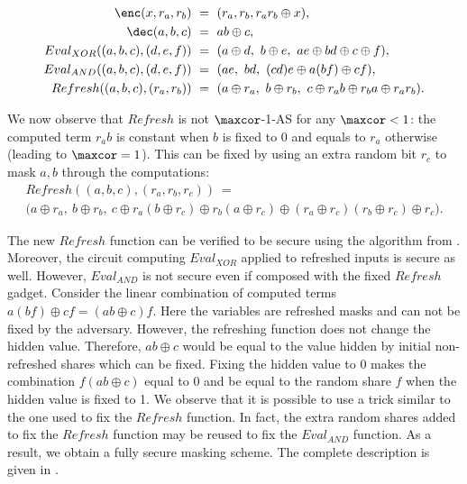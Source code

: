 \begin{figure}
\vspace{-0.5em}
\vspace{-0.5em}
\begin{align}
    \enc(x,r_a,r_b)              &~=~ (r_a,r_b,r_ar_b \oplus x),\\
    \dec(a,b,c)                  &~=~ ab \oplus c,\\
    Eval_{XOR}((a,b,c),(d,e,f)) &~=~ (a\oplus d,~ b \oplus e,~  ae \oplus bd \oplus c \oplus f),\\
    Eval_{AND}((a,b,c),(d,e,f)) &~=~ (ae,~        bd,~         (cd)e \oplus a(bf) \oplus cf),\\
    Refresh((a,b,c),(r_a,r_b))  &~=~ (a \oplus r_a,~ b \oplus r_b,~ c \oplus r_ab \oplus r_ba \oplus r_a r_b).
\end{align}
\vspace{-0.5em}
\end{figure}

We now observe that $Refresh$ is not $\maxcor$-1-AS for any $\maxcor < 1$: the computed term $r_a b$ is constant when $b$ is fixed to 0 and equals to $r_a$ otherwise (leading to $\maxcor = 1$). This can be fixed by using an extra random bit $r_c$ to mask $a,b$ through the computations:
\begin{multline}
    Refresh((a,b,c),(r_a,r_b,r_c)) ~=~ \\
    \big(
    a \oplus r_a,~
    b \oplus r_b,~
    c \oplus r_a(b \oplus r_c) \oplus r_b (a \oplus r_c) \oplus (r_a \oplus r_c)(r_b \oplus r_c) \oplus r_c
    \big).
\end{multline}

The new $Refresh$ function can be verified to be secure using the algorithm from . Moreover, the circuit computing $Eval_{XOR}$ applied to refreshed inputs is secure as well. However, $Eval_{AND}$ is not secure even if composed with the fixed $Refresh$ gadget. Consider the linear combination of computed terms $a(bf) \oplus cf = (ab \oplus c)f$. Here the variables are refreshed masks and can not be fixed by the adversary. However, the refreshing function does not change the hidden value. Therefore, $ab \oplus c$ would be equal to the value hidden by initial non-refreshed shares which can be fixed. Fixing the hidden value to 0 makes the combination $f(ab \oplus c)$ equal to 0 and be equal to the random share $f$ when the hidden value is fixed to 1. We observe that it is possible to use a trick similar to the one used to fix the $Refresh$ function. In fact, the extra random shares added to fix the $Refresh$ function may be reused to fix the $Eval_{AND}$ function. As a result, we obtain a fully secure masking scheme. The complete description is given in .

